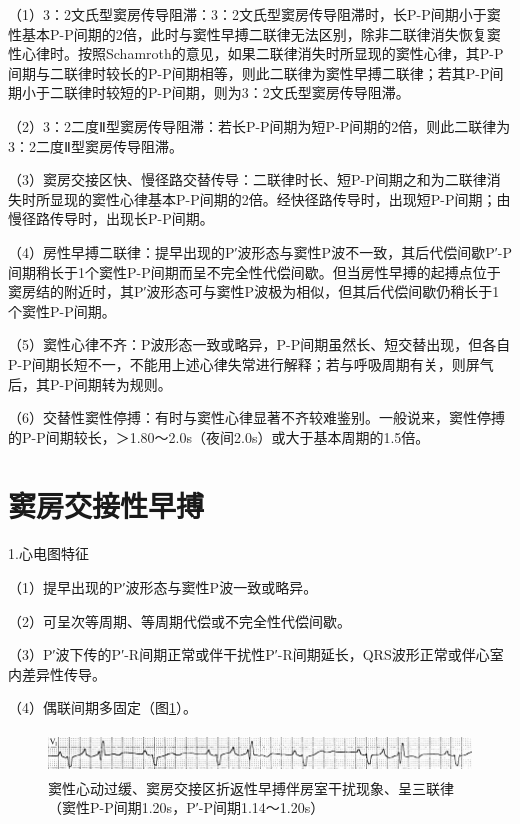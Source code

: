 （1）3：2文氏型窦房传导阻滞：3：2文氏型窦房传导阻滞时，长P-P间期小于窦性基本P-P间期的2倍，此时与窦性早搏二联律无法区别，除非二联律消失恢复窦性心律时。按照Schamroth的意见，如果二联律消失时所显现的窦性心律，其P-P间期与二联律时较长的P-P间期相等，则此二联律为窦性早搏二联律；若其P-P间期小于二联律时较短的P-P间期，则为3：2文氏型窦房传导阻滞。

（2）3：2二度Ⅱ型窦房传导阻滞：若长P-P间期为短P-P间期的2倍，则此二联律为3：2二度Ⅱ型窦房传导阻滞。

（3）窦房交接区快、慢径路交替传导：二联律时长、短P-P间期之和为二联律消失时所显现的窦性心律基本P-P间期的2倍。经快径路传导时，出现短P-P间期；由慢径路传导时，出现长P-P间期。

（4）房性早搏二联律：提早出现的P′波形态与窦性P波不一致，其后代偿间歇P′-P间期稍长于1个窦性P-P间期而呈不完全性代偿间歇。但当房性早搏的起搏点位于窦房结的附近时，其P′波形态可与窦性P波极为相似，但其后代偿间歇仍稍长于1个窦性P-P间期。

（5）窦性心律不齐：P波形态一致或略异，P-P间期虽然长、短交替出现，但各自P-P间期长短不一，不能用上述心律失常进行解释；若与呼吸周期有关，则屏气后，其P-P间期转为规则。

（6）交替性窦性停搏：有时与窦性心律显著不齐较难鉴别。一般说来，窦性停搏的P-P间期较长，＞1.80～2.0s（夜间2.0s）或大于基本周期的1.5倍。

\protect\hypertarget{text00018.htmlux5cux23subid133}{}{}

\section{窦房交接性早搏}

1.心电图特征

（1）提早出现的P′波形态与窦性P波一致或略异。

（2）可呈次等周期、等周期代偿或不完全性代偿间歇。

（3）P′波下传的P′-R间期正常或伴干扰性P′-R间期延长，QRS波形正常或伴心室内差异性传导。

（4）偶联间期多固定（图\ref{fig11-3}）。

\begin{figure}[!htbp]
 \centering
 \includegraphics[width=5.78125in,height=0.4375in]{./images/Image00155.jpg}
 \captionsetup{justification=centering}
 \caption{窦性心动过缓、窦房交接区折返性早搏伴房室干扰现象、呈三联律（窦性P-P间期1.20s，P′-P间期1.14～1.20s）}
 \label{fig11-3}
  \end{figure} 

